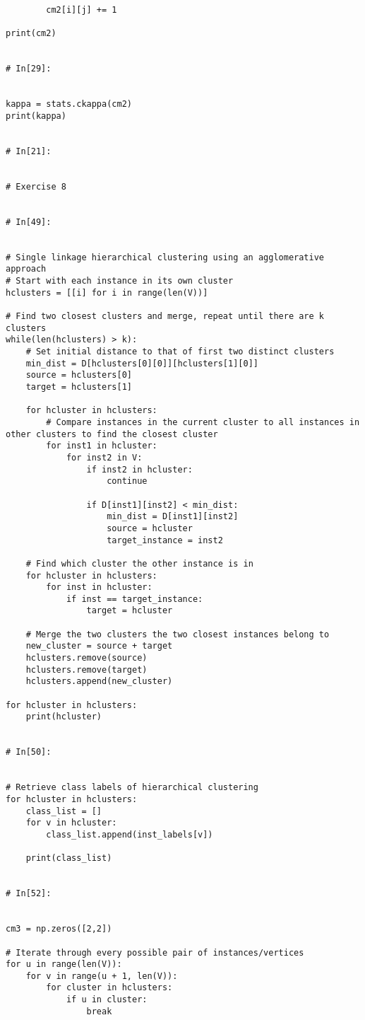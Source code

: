 \documentclass[11pt, a4paper]{article}
\begin{document}
\begin{verbatim}
        cm2[i][j] += 1
        
print(cm2)


# In[29]:


kappa = stats.ckappa(cm2)
print(kappa)


# In[21]:


# Exercise 8


# In[49]:


# Single linkage hierarchical clustering using an agglomerative approach
# Start with each instance in its own cluster
hclusters = [[i] for i in range(len(V))]

# Find two closest clusters and merge, repeat until there are k clusters
while(len(hclusters) > k):
    # Set initial distance to that of first two distinct clusters
    min_dist = D[hclusters[0][0]][hclusters[1][0]]
    source = hclusters[0]
    target = hclusters[1]

    for hcluster in hclusters:
        # Compare instances in the current cluster to all instances in other clusters to find the closest cluster
        for inst1 in hcluster:
            for inst2 in V:
                if inst2 in hcluster:
                    continue

                if D[inst1][inst2] < min_dist:
                    min_dist = D[inst1][inst2]
                    source = hcluster
                    target_instance = inst2

    # Find which cluster the other instance is in
    for hcluster in hclusters:
        for inst in hcluster:
            if inst == target_instance:
                target = hcluster

    # Merge the two clusters the two closest instances belong to
    new_cluster = source + target
    hclusters.remove(source)
    hclusters.remove(target)
    hclusters.append(new_cluster)
    
for hcluster in hclusters:
    print(hcluster)


# In[50]:


# Retrieve class labels of hierarchical clustering
for hcluster in hclusters:
    class_list = []
    for v in hcluster:
        class_list.append(inst_labels[v])
        
    print(class_list)


# In[52]:


cm3 = np.zeros([2,2])

# Iterate through every possible pair of instances/vertices
for u in range(len(V)):
    for v in range(u + 1, len(V)):
        for cluster in hclusters:
            if u in cluster:
                break
                

\end{verbatim}
\end{document}
